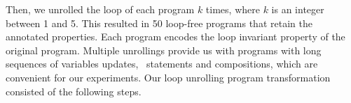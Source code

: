 Then, we unrolled the loop of each program $k$ times, where $k$ is an integer between 1 and 5. This resulted in 50 loop-free programs that retain the annotated properties.
%
%
%
Each program encodes the loop invariant property of the original program. 
Multiple unrollings provide us with programs with long sequences of variables updates, \ITE\ statements and compositions, which are convenient for our experiments.
%
Our loop unrolling program transformation consisted of the following steps.
